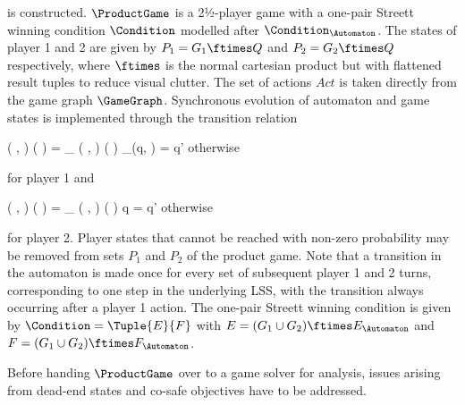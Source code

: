     is constructed.
    $\ProductGame$ is a 2½-player game with a one-pair Streett winning condition $\Condition$ modelled after $\Condition_\Automaton$.
    The states of player 1 and 2 are given by $P_1 = G_1 \ftimes Q$ and $P_2 = G_2 \ftimes Q$ respectively, where $\ftimes$ is the normal cartesian product but with flattened result tuples to reduce visual clutter.
    The set of actions $Act$ is taken directly from the game graph $\GameGraph$.
    Synchronous evolution of automaton and game states is implemented through the transition relation

    \startformula
        \Transition
            \Big( ,  \Big)
            \Big(  \Big)
        = \startmathcases
            \NC \Transition_\GameGraph
            \Big( ,  \Big)
            \Big(  \Big)
            \MC \StartIf \Transition_\Automaton(q, ) = q'
            \NR
            \NC otherwise
            \NR
        \stopmathcases
    \stopformula

    for player 1 and

    \startformula
        \Transition
            \Big( ,  \Big)
            \Big(  \Big)
        = \startmathcases
            \NC \Transition_\GameGraph
            \Big( ,  \Big)
            \Big(  \Big)
            \MC \StartIf q = q'
            \NR
            \NC otherwise
            \NR
        \stopmathcases
    \stopformula

    for player 2.
    Player states that cannot be reached with non-zero probability may be removed from sets $P_1$ and $P_2$ of the product game.
    Note that a transition in the automaton is made once for every set of subsequent player 1 and 2 turns, corresponding to one step in the underlying LSS, with the transition always occurring after a player 1 action.
    The one-pair Streett winning condition is given by $\Condition = \Tuple{E}{F}$ with $E = (G_1 \cup G_2) \ftimes E_\Automaton$ and $F = (G_1 \cup G_2) \ftimes F_\Automaton$.

    Before handing $\ProductGame$ over to a game solver for analysis, issues arising from dead-end states and co-safe objectives have to be addressed.

\stopsubsection


